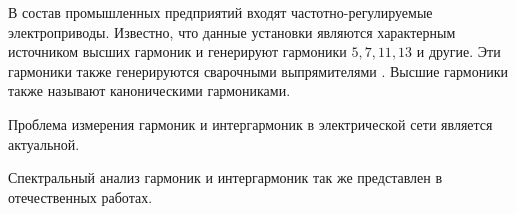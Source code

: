 В состав промышленных предприятий входят частотно-регулируемые электроприводы. Известно, что данные установки являются характерным источником высших гармоник и генерируют гармоники $5,7,11,13$ и другие. Эти гармоники также генерируются сварочными выпрямителями \cite{Calculation_Current_Mikheev_2017}. Высшие гармоники также называют каноническими гармониками.

Проблема измерения гармоник и интергармоник в электрической сети является актуальной. \cite{testa2007интергармоники, gunther2001interharmonics, 532851, testa2002interharmonic}

 
Спектральный анализ гармоник и интергармоник так же представлен в отечественных работах. \cite{Improving_methods_Shizma_2014,Harmonic_analysis_Goldstein2009, Development_method_Osipov_2017}



